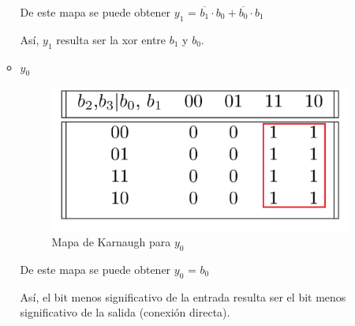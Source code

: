 \documentclass[../../informe/src/main.tex]{subfiles}
\begin{document}
\begin{enumerate}
\begin{itemize}
De este mapa se puede obtener $y_1$ = $\overline{b_{1}} \cdot b_{0}  + \overline{b_{0}} \cdot b_{1}$ 
\par
Así, $y_1$ resulta ser la xor entre $b_{1}$ y $b_{0}$.

\item $y_0$					


\begin{figure}[H]	%
	\centering
	\includegraphics[scale=0.5]{imagenes/karnaugh_mapa_y0.png}
	\caption{Mapa de Karnaugh para $y_0$}
	\label{fig:ej4_karnaugh_mapa_y0}
\end{figure}

De este mapa se puede obtener $y_0$ = $b_{0} $ 
\par
Así, el bit menos significativo de la entrada resulta ser el bit menos significativo de la salida (conexión directa).

\end{itemize} 

\end{enumerate}
 	
\end{document}
